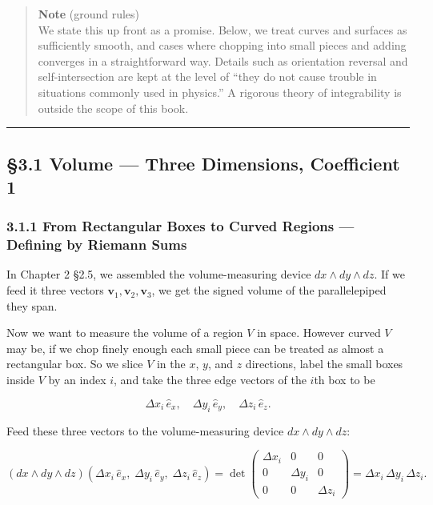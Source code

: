 \begin{quote}
\textbf{Note} (ground rules)\\
We state this up front as a promise. Below, we treat curves and surfaces
as sufficiently smooth, and cases where chopping into small pieces and
adding converges in a straightforward way. Details such as orientation
reversal and self-intersection are kept at the level of ``they do not
cause trouble in situations commonly used in physics.'' A rigorous
theory of integrability is outside the scope of this book.
\end{quote}

\begin{center}\rule{0.5\linewidth}{0.5pt}\end{center}

\hypertarget{volume-three-dimensions-coefficient-1}{%
\subsection{§3.1 Volume --- Three Dimensions, Coefficient
1}\label{volume-three-dimensions-coefficient-1}}

\hypertarget{from-rectangular-boxes-to-curved-regions-defining-by-riemann-sums}{%
\subsubsection{3.1.1 From Rectangular Boxes to Curved Regions ---
Defining by Riemann
Sums}\label{from-rectangular-boxes-to-curved-regions-defining-by-riemann-sums}}

In Chapter 2 §2.5, we assembled the volume-measuring device
\(dx \wedge dy \wedge dz\). If we feed it three vectors
\(\mathbf{v}_1, \mathbf{v}_2, \mathbf{v}_3\), we get the signed volume
of the parallelepiped they span.

Now we want to measure the volume of a region \(V\) in space. However
curved \(V\) may be, if we chop finely enough each small piece can be
treated as almost a rectangular box. So we slice \(V\) in the \(x\),
\(y\), and \(z\) directions, label the small boxes inside \(V\) by an
index \(i\), and take the three edge vectors of the \(i\)th box to be

\[\Delta x_i\,\hat{e}_x,\quad \Delta y_i\,\hat{e}_y,\quad \Delta z_i\,\hat{e}_z.\]

Feed these three vectors to the volume-measuring device
\(dx \wedge dy \wedge dz\):

\[(dx \wedge dy \wedge dz)(\Delta x_i\,\hat{e}_x,\; \Delta y_i\,\hat{e}_y,\; \Delta z_i\,\hat{e}_z) = \det\begin{pmatrix}\Delta x_i & 0 & 0 \\ 0 & \Delta y_i & 0 \\ 0 & 0 & \Delta z_i\end{pmatrix} = \Delta x_i\,\Delta y_i\,\Delta z_i.\]

